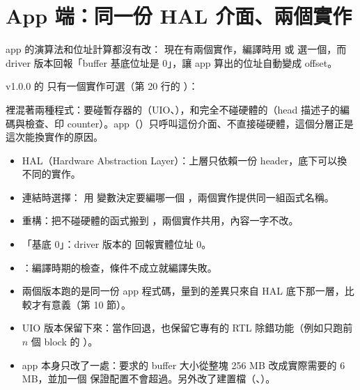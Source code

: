 \clearpage
\section{App 端：同一份 HAL 介面、兩個實作}
\label{sec:hal}

\begin{oneline}
app 的演算法和位址計算都沒有改： 現在有兩個實作，編譯時用  或  選一個，而 driver 版本回報「buffer 基底位址是 0」，讓 app 算出的位址自動變成 offset。
\end{oneline}

\begin{before}
v1.0.0 的  只有一個實作可選（第 20 行的 ）：


 裡混著兩種程式：要碰暫存器的（UIO、），和完全不碰硬體的（head 描述子的編碼與檢查、印 counter）。app（）只呼叫這份介面、不直接碰硬體，這個分層正是這次能換實作的原因。
\end{before}

\begin{tech}
\begin{itemize}
\item HAL（Hardware Abstraction Layer）：上層只依賴一份 header，底下可以換不同的實作。
\item 連結時選擇： 用  變數決定要編哪一個 ，兩個實作提供同一組函式名稱。
\item 重構：把不碰硬體的函式搬到 ，兩個實作共用，內容一字不改。
\item 「基底 0」：driver 版本的  回報實體位址 0。
\item {}：編譯時期的檢查，條件不成立就編譯失敗。
\end{itemize}
\end{tech}

\begin{gain}
\begin{itemize}
\item 兩個版本跑的是同一份 app 程式碼，量到的差異只來自 HAL 底下那一層，比較才有意義（第 10 節）。
\item UIO 版本保留下來：當作回退，也保留它專有的 RTL 除錯功能（例如只跑前 $n$ 個 block 的 ）。
\item app 本身只改了一處：要求的 buffer 大小從整塊 256 MB 改成實際需要的 6 MB，並加一個  保證配置不會超過。另外改了建置檔（、）。
\end{itemize}
\end{gain}

